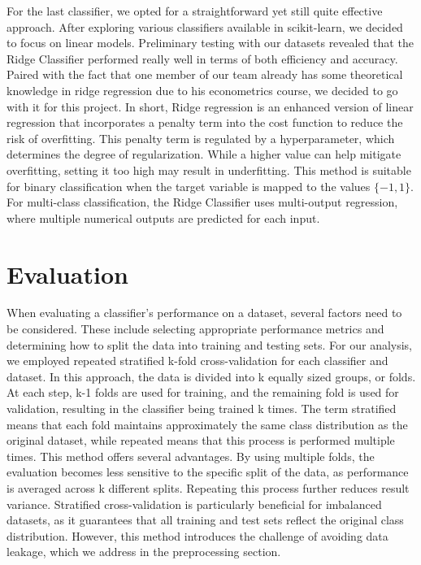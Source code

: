 \documentclass[a4paper,10pt]{article}
\begin{document}
For the last classifier, we opted for a straightforward yet still quite effective approach. After exploring various classifiers available in scikit-learn, we decided to focus on linear models. Preliminary testing with our datasets revealed that the Ridge Classifier performed really well in terms of both efficiency and accuracy. Paired with the fact that one member of our team already has some theoretical knowledge in ridge regression due to his econometrics course, we decided to go with it for this project. 
In short, Ridge regression is an enhanced version of linear regression that incorporates a penalty term into the cost function to reduce the risk of overfitting. This penalty term is regulated by a hyperparameter, which determines the degree of regularization. While a higher value can help mitigate overfitting, setting it too high may result in underfitting. This method is suitable for binary classification when the target variable is mapped to the values $\{-1, 1\}$. For multi-class classification, the Ridge Classifier uses multi-output regression, where multiple numerical outputs are predicted for each input.

\section{Evaluation}

When evaluating a classifier's performance on a dataset, several factors need to be considered. These include selecting appropriate performance metrics and determining how to split the data into training and testing sets. For our analysis, we employed repeated stratified k-fold cross-validation for each classifier and dataset. In this approach, the data is divided into k equally sized groups, or folds. At each step, k-1 folds are used for training, and the remaining fold is used for validation, resulting in the classifier being trained k times. The term stratified means that each fold maintains approximately the same class distribution as the original dataset, while repeated means that this process is performed multiple times. This method offers several advantages. By using multiple folds, the evaluation becomes less sensitive to the specific split of the data, as performance is averaged across k different splits. Repeating this process further reduces result variance. Stratified cross-validation is particularly beneficial for imbalanced datasets, as it guarantees that all training and test sets reflect the original class distribution. However, this method introduces the challenge of avoiding data leakage, which we address in the preprocessing section.
\end{document}
